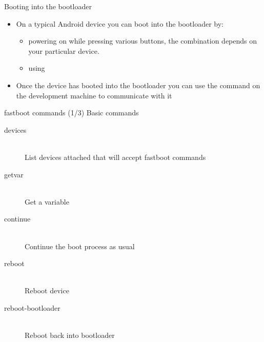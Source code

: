 \begin{frame}[fragile]{Booting into the bootloader}
  \begin{itemize}
    \item On a typical Android device you can boot into the bootloader by:
      \begin{itemize}
         \item powering on while pressing various buttons, the
           combination depends on your particular device.
         \item using 
      \end{itemize}
    \item Once the device has booted into the bootloader you can use
      the  command on the development machine to
      communicate with it
  \end{itemize}
\end{frame}

\begin{frame}{fastboot commands (1/3)}
Basic commands
  \begin{description}
    \item[devices\hfill] \hfill \\
      List devices attached that will accept fastboot commands
    \item[getvar\hfill] \hfill \\
      Get a variable
    \item[continue\hfill] \hfill \\
      Continue the boot process as usual
    \item[reboot\hfill] \hfill \\
      Reboot device
    \item[reboot-bootloader] \hfill \\
      Reboot back into bootloader
  \end{description}
\end{frame}

